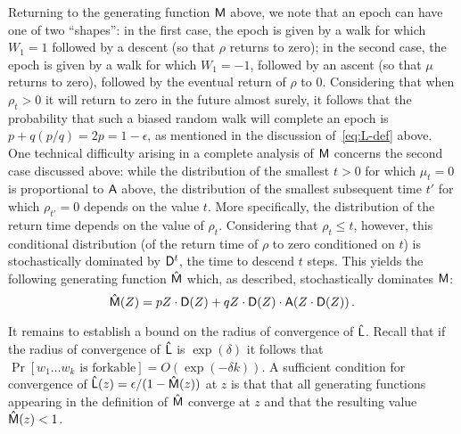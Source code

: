   Returning to the generating function $\mathsf{M}$ above, we note that an
  epoch can have one of two ``shapes'': in the first case, the epoch
  is given by a walk for which $W_1 = 1$ followed by a descent (so
  that $\rho$ returns to zero); in the second case, the epoch is
  given by a walk for which $W_1 = -1$, followed by an ascent (so that
  $\mu$ returns to zero), followed by the eventual return of $\rho$
  to 0. Considering that when $\rho_t > 0$ it will return to zero
  in the future almost surely, it follows that the probability that
  such a biased random walk will complete an epoch is
  $p + q(p/q) = 2p = 1 - \epsilon$, as mentioned in the discussion
  of~\eqref{eq:L-def} above. One technical difficulty arising in a
  complete analysis of $\mathsf{M}$ concerns the second case discussed
  above: while the distribution of the smallest $t > 0$ for which
  $\mu_t = 0$ is proportional to $\mathsf{A}$ above, the distribution of
  the smallest subsequent time $t'$ for which $\rho_{t'} = 0$
  depends on the value $t$. More specifically, the distribution of the
  return time depends on the value of $\rho_t$. Considering that
  $\rho_t \leq t$, however, this conditional distribution (of the
  return time of $\rho$ to zero conditioned on $t$) is
  stochastically dominated by $\mathsf{D}^t$, the time to descend $t$
  steps. This yields the following generating function $\mathsf{\hat{M}}$
  which, as described, stochastically dominates $\mathsf{M}$:
  \[
    \mathsf{\hat{M}}(Z) = pZ\cdot \mathsf{D}(Z) + qZ \cdot \mathsf{D}(Z) \cdot
    \mathsf{A}(Z\cdot \mathsf{D}(Z))\,.
  \]
  
  It remains to establish a bound on the radius of convergence of
  $\mathsf{\hat{L}}$. Recall that if the radius of convergence of
  $\mathsf{\hat{L}}$ is $\exp(\delta)$ it follows that
  $\Pr[\text{$w_1 \ldots w_k$ is forkable}] = O(\exp(-\delta k))$. A
  sufficient condition for convergence of
  $\mathsf{\hat{L}}(z) = \epsilon/(1 - \mathsf{\hat{M}}(z))$ at $z$ is that
  that all generating functions appearing in the definition of
  $\mathsf{\hat{M}}$ converge at $z$ and that the resulting value
  $\mathsf{\hat{M}}(z) < 1$.
  
